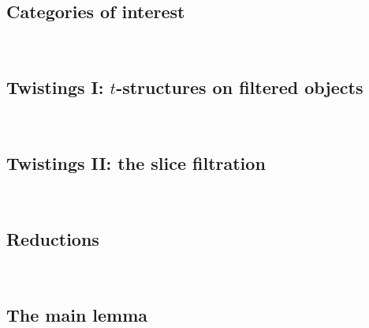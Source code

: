 
\subsection{Categories of interest} \label{subsec:cats}\ 



\subsection{Twistings I: $t$-structures on filtered objects} \label{subsec:twists}\ 



\subsection{Twistings II: the slice filtration} \label{subsec:slice}\ 



\subsection{Reductions} \label{subsec:reds}\ 



\subsection{The main lemma} \label{subsec:main-lem}\ 



